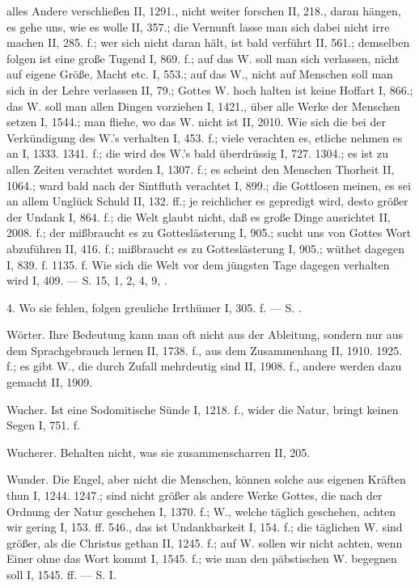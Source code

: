 alles Andere verschließen II, 1291., nicht weiter forschen II, 218., daran hängen, es gehe uns, wie es wolle II, 357.; die Vernunft lasse man sich dabei nicht irre machen II, 285. f.; wer sich nicht daran hält, ist bald verführt II, 561.; demselben folgen ist eine große Tugend I, 869. f.; auf das W. soll man sich verlassen, nicht auf eigene Größe, Macht etc. I, 553.; auf das W., nicht auf Menschen soll man sich in der Lehre verlassen II, 79.; Gottes W. hoch halten ist keine Hoffart I, 866.; das W. soll man allen Dingen vorziehen I, 1421., über alle Werke der Menschen setzen I, 1544.; man fliehe, wo das W. nicht ist II, 2010. Wie sich die  bei der Verkündigung des W.’s verhalten I, 453. f.; viele verachten es, etliche nehmen es an I, 1333. 1341. f.; die  wird des W.’s bald überdrüssig I, 727. 1304.; es ist zu allen Zeiten verachtet worden I, 1307. f.; es scheint den Menschen Thorheit II, 1064.; ward bald nach der Sintfluth verachtet I, 899.; die Gottlosen meinen, es sei an allem Unglück Schuld II, 132. ff.; je reichlicher es gepredigt wird, desto größer der Undank I, 864. f.; die Welt glaubt nicht, daß es große Dinge ausrichtet II, 2008. f.; der  mißbraucht es zu Gotteslästerung I, 905.;  sucht uns von Gottes Wort abzuführen II, 416. f.; mißbraucht es zu Gotteslästerung I, 905.; wüthet dagegen I, 839. f. 1135. f. Wie sich die Welt vor dem jüngsten Tage dagegen verhalten wird I, 409. — S.  15,  1, 2,  4,  9, .

4.  Wo sie fehlen, folgen greuliche Irrthümer I, 305. f. — S. .

Wörter. Ihre Bedeutung kann man oft nicht aus der Ableitung, sondern nur aus dem Sprachgebrauch lernen II, 1738. f., aus dem Zusammenhang II, 1910. 1925. f.; es gibt W., die durch Zufall mehrdeutig sind II, 1908. f., andere werden dazu gemacht II, 1909.

Wucher. Ist eine Sodomitische Sünde I, 1218. f., wider die Natur, bringt keinen Segen I, 751. f.

Wucherer. Behalten nicht, was sie zusammenscharren II, 205.

Wunder. Die Engel, aber nicht die Menschen, können solche aus eigenen Kräften thun I, 1244. 1247.; sind nicht größer als andere Werke Gottes, die nach der Ordnung der Natur geschehen I, 1370. f.; W., welche täglich geschehen, achten wir gering I, 153. ff. 546., das ist Undankbarkeit I, 154. f.; die täglichen W. sind größer, als die Christus gethan II, 1245. f.; auf W. sollen wir nicht achten, wenn Einer ohne das Wort kommt I, 1545. f.; wie man den päbstischen W. begegnen soll I, 1545. ff. — S.  I.


